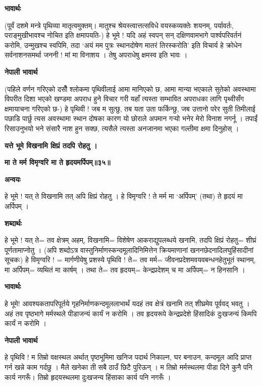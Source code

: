 \documentclass[11pt, a5paper]{article}
\begin{document}
\textbf{भावार्थः}

(पूर्वं दशमे मन्त्रे पृथिव्या मातृत्वमुक्तम्। मातुश्च श्रेयस्त्वात्तत्सविधे वयस्कव्यक्तेः शयनम्, पर्यावर्तः, पराङ्‍मुखीभावश्च नोचित इति क्षमापयति-) हे भूमे ! यदि अहं स्वपन् सन् दक्षिणवामभागे पार्श्वपरिवर्तनं करोमि, उन्मुखश्च स्वपिमि, तदा ‘अयं मम पुत्रः स्थानदोषेण मातरं तिरस्करोति’ इति विचार्य हे क्रोधेन सर्वनाशनसमर्था जननी ! मां  मा विनाशय । तेषु अपराधेषु क्षमस्व इति भावः ।

\textbf{नेपाली भावार्थ}

(पहिले वर्णन गरिएको दसौँ श्लोकमा पृथिवीलाई आमा मानिएको छ, आमा मान्या भएकाले सुतेको अवस्थामा विपरीत दिशा भएको खण्डमा अपराध हुने विचार गरी यहाँ त्यस्ता सम्भावित अपराधका लागि पृथ्वीसँग क्षमायाचना गरिएको छ-) हे पृथिवी ! जब म सुत्छु, तब यता उता फर्किन्छु, जब उत्तानो परेर सुती तिमीलाई पछाडि पार्छु त्यस अवस्थामा स्थान दोषका कारण यो छोराले अपमान गर्‍यो भनेर मेरो विनाश नगर्नू । तपाईं रिसाउनुभयो भने संसारै नाश हुन सक्छ, त्यसैले त्यस्ता अनजानमा भएका गल्तीमा क्षमा दिनुहोस् ।

\textbf{यत्ते भूमे विखनामि क्षिप्रं तदपि रोहतु ।}

\textbf{मा ते मर्म विमृग्वरि मा ते हृदयमर्पिपम्॥३५॥}

\textbf{अन्वयः}

हे भूमे ! यत् ते विखनामि तत् अपि क्षिप्रं रोहतु । हे विमृग्वरि ! ते मर्म मा ‘अर्पिपम्’ (तथा) ते हृदयं मा अर्पिपम् ।

\textbf{शब्दार्थः}

हे भूमे ! यत् ते= तव क्षेत्रम् अहम्, विखनामि= विशेषेण आकराद्युपलब्धये खनामि, तदपि क्षिप्रं रोहतु= शीघ्रं पूर्णतामाप्नोतु । (अपि शब्दोऽत्र वास्तुनिर्माणस्कन्दमूलादिनिमित्तेन क्रियमाणानां खननछेदनादिलघुहिंसादीनां सूचकः) हे विमृग्वरि ! = मार्गणीयेषु प्रशस्ये पृथिवि ! ते= तव मर्म= जीवनप्रदेशमवयवबन्धनहेतुभूतं स्थानम्, मा अर्पिपम्= व्यथितं मा कार्षम् । तथा ते= तव हृदयम्= केन्द्रप्रदेशम् च मा अर्पिपम्= न हिनसानि ।

\textbf{भावार्थः}

हे भूमे! आवश्यकतापरिपूर्तये गृहनिर्माणकन्दमूललाभार्थं यदहं तव क्षेत्रं खनामि तत् शीघ्रमेव पूर्ववद् भवतु । अहं तव पृष्ठभागे मर्मस्थले पीडाजन्यं कार्यं न करोमि । तव हृदयरूपे केन्द्रप्रदेशे हिंसादिकं दुःखजन्यं किमपि कार्यं न करोमि ।

\textbf{नेपाली भावार्थ}

हे पृथिवि ! म तिम्रो वक्षस्थल अर्थात् पृष्ठभूमिमा खनिज पदार्थ निकाल्न, घर बनाउन, कन्दमूल आदि प्राप्त गर्न खन्ने काम गर्दछु । मैले खनेका ती सबै ठाउँ छिटै पुरिऊन् । म तिम्रो मर्मस्थलमा पीडा दिने कुनै पनि कार्य नगरूँ। तिम्रो हृदयस्थलमा दुःखजन्य हिंसाका कार्य पनि नगरूँ ।
\end{document}

